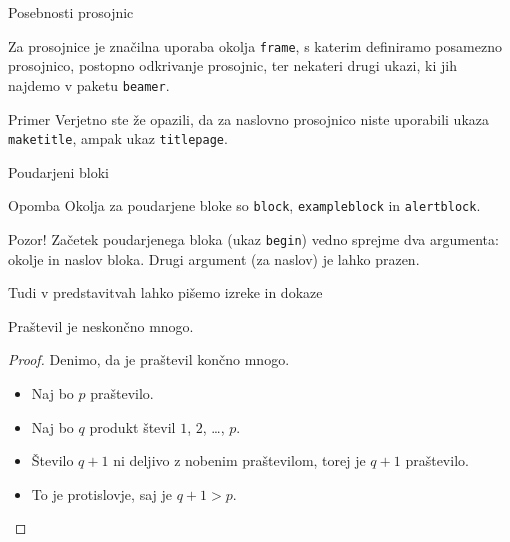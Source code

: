 \begin{frame}{Posebnosti prosojnic}

	Za prosojnice je značilna uporaba okolja \texttt{frame},
	s katerim definiramo posamezno prosojnico,\pause 
	postopno odkrivanje prosojnic,\pause 
	ter nekateri drugi ukazi, ki jih najdemo v paketu \texttt{beamer}.\pause
	\begin{exampleblock}{Primer}
		Verjetno ste že opazili, da za naslovno prosojnico niste uporabili
		ukaza \texttt{maketitle}, ampak ukaz \texttt{titlepage}.
	\end{exampleblock}
\end{frame}

\begin{frame}{Poudarjeni bloki}
	\begin{block}{Opomba}
		Okolja za poudarjene bloke so \texttt{block}, \texttt{exampleblock} in \texttt{alertblock}.
	\end{block}
	\begin{alertblock}{Pozor!}
		Začetek poudarjenega bloka (ukaz \texttt{begin}) vedno sprejme 
		dva argumenta: okolje in naslov bloka.
		Drugi argument (za naslov) je lahko prazen. 
	\end{alertblock}
\end{frame}

\begin{frame}{Tudi v predstavitvah lahko pišemo izreke in dokaze}

	\begin{izrek}
	   Praštevil je neskončno mnogo.
	\end{izrek}
	\begin{proof}
	   Denimo, da je praštevil končno mnogo.
	   \begin{itemize}[<+->]
		  \item Naj bo \(p\)  praštevilo.
		  \item Naj bo \(q\) produkt števil \(1\), \(2\), \ldots, \(p\).
		  \item Število \(q+1\) ni deljivo z nobenim praštevilom, torej je \(q+1\) praštevilo.
		  \item To je protislovje, saj je \(q+1>p\). \qedhere
	   \end{itemize}
	\end{proof}
 \end{frame}
 
